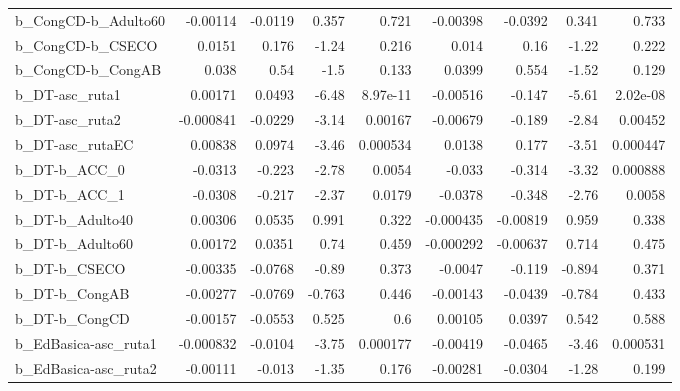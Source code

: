 \begin{tabular}{lrrrrrrrr}
b\_CongCD-b\_Adulto60        &    -0.00114 &      -0.0119 &     0.357 &    0.721 &   -0.00398 &     -0.0392 &        0.341 &         0.733 \\
b\_CongCD-b\_CSECO           &      0.0151 &        0.176 &     -1.24 &    0.216 &      0.014 &        0.16 &        -1.22 &         0.222 \\
b\_CongCD-b\_CongAB          &       0.038 &         0.54 &      -1.5 &    0.133 &     0.0399 &       0.554 &        -1.52 &         0.129 \\
b\_DT-asc\_ruta1             &     0.00171 &       0.0493 &     -6.48 & 8.97e-11 &   -0.00516 &      -0.147 &        -5.61 &      2.02e-08 \\
b\_DT-asc\_ruta2             &   -0.000841 &      -0.0229 &     -3.14 &  0.00167 &   -0.00679 &      -0.189 &        -2.84 &       0.00452 \\
b\_DT-asc\_rutaEC            &     0.00838 &       0.0974 &     -3.46 & 0.000534 &     0.0138 &       0.177 &        -3.51 &      0.000447 \\
b\_DT-b\_ACC\_0               &     -0.0313 &       -0.223 &     -2.78 &   0.0054 &     -0.033 &      -0.314 &        -3.32 &      0.000888 \\
b\_DT-b\_ACC\_1               &     -0.0308 &       -0.217 &     -2.37 &   0.0179 &    -0.0378 &      -0.348 &        -2.76 &        0.0058 \\
b\_DT-b\_Adulto40            &     0.00306 &       0.0535 &     0.991 &    0.322 &  -0.000435 &    -0.00819 &        0.959 &         0.338 \\
b\_DT-b\_Adulto60            &     0.00172 &       0.0351 &      0.74 &    0.459 &  -0.000292 &    -0.00637 &        0.714 &         0.475 \\
b\_DT-b\_CSECO               &    -0.00335 &      -0.0768 &     -0.89 &    0.373 &    -0.0047 &      -0.119 &       -0.894 &         0.371 \\
b\_DT-b\_CongAB              &    -0.00277 &      -0.0769 &    -0.763 &    0.446 &   -0.00143 &     -0.0439 &       -0.784 &         0.433 \\
b\_DT-b\_CongCD              &    -0.00157 &      -0.0553 &     0.525 &      0.6 &    0.00105 &      0.0397 &        0.542 &         0.588 \\
b\_EdBasica-asc\_ruta1       &   -0.000832 &      -0.0104 &     -3.75 & 0.000177 &   -0.00419 &     -0.0465 &        -3.46 &      0.000531 \\
b\_EdBasica-asc\_ruta2       &    -0.00111 &       -0.013 &     -1.35 &    0.176 &   -0.00281 &     -0.0304 &        -1.28 &         0.199 \\

\end{tabular}
